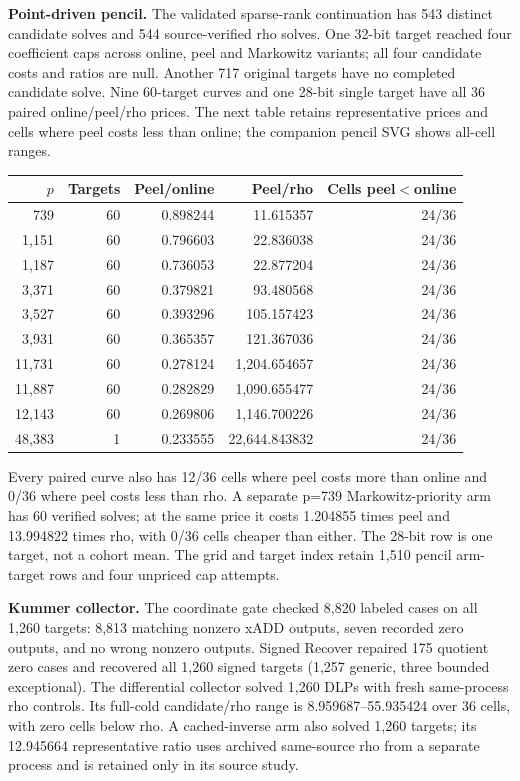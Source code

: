 \documentclass[10pt]{article}
\begin{document}
\par\medskip
\noindent\textbf{Point-driven pencil.} The validated sparse-rank continuation has 543 distinct candidate solves and 544 source-verified rho solves. One 32-bit target reached four coefficient caps across online, peel and Markowitz variants; all four candidate costs and ratios are null. Another 717 original targets have no completed candidate solve. Nine 60-target curves and one 28-bit single target have all 36 paired online/peel/rho prices. The next table retains representative prices and cells where peel costs less than online; the companion pencil SVG shows all-cell ranges.
\par\medskip
\begin{center}\small\begin{tabular}{r|r|r r|r}
$p$ & Targets & Peel/online & Peel/rho & Cells peel$<$online\\\hline
739 & 60 & 0.898244 & 11.615357 & 24/36\\
1,151 & 60 & 0.796603 & 22.836038 & 24/36\\
1,187 & 60 & 0.736053 & 22.877204 & 24/36\\
3,371 & 60 & 0.379821 & 93.480568 & 24/36\\
3,527 & 60 & 0.393296 & 105.157423 & 24/36\\
3,931 & 60 & 0.365357 & 121.367036 & 24/36\\
11,731 & 60 & 0.278124 & 1,204.654657 & 24/36\\
11,887 & 60 & 0.282829 & 1,090.655477 & 24/36\\
12,143 & 60 & 0.269806 & 1,146.700226 & 24/36\\
48,383 & 1 & 0.233555 & 22,644.843832 & 24/36\\
\end{tabular}\end{center}
\noindent Every paired curve also has 12/36 cells where peel costs more than online and 0/36 where peel costs less than rho. A separate p=739 Markowitz-priority arm has 60 verified solves; at the same price it costs 1.204855 times peel and 13.994822 times rho, with 0/36 cells cheaper than either. The 28-bit row is one target, not a cohort mean. The grid and target index retain 1,510 pencil arm-target rows and four unpriced cap attempts.
\par\medskip
\noindent\textbf{Kummer collector.} The coordinate gate checked 8,820 labeled cases on all 1,260 targets: 8,813 matching nonzero xADD outputs, seven recorded zero outputs, and no wrong nonzero outputs. Signed Recover repaired 175 quotient zero cases and recovered all 1,260 signed targets (1,257 generic, three bounded exceptional). The differential collector solved 1,260 DLPs with fresh same-process rho controls. Its full-cold candidate/rho range is 8.959687--55.935424 over 36 cells, with zero cells below rho. A cached-inverse arm also solved 1,260 targets; its 12.945664 representative ratio uses archived same-source rho from a separate process and is retained only in its source study.
\end{document}
